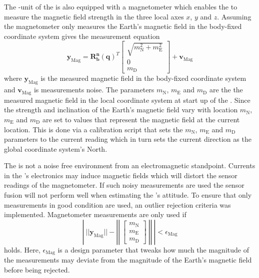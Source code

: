 The \abbrIO-unit of the \abbrROV is also equipped with a magnetometer which enables the \abbrROV to measure the magnetic field strength in the three local axes $x$, $y$ and $z$. Assuming the magnetometer only measures the Earth's magnetic field in the body-fixed coordinate system gives the measurement equation 
\begin{equation}
\boldsymbol{y}_{\text{Mag}} = 
    \boldsymbol{R^n_b}(\boldsymbol{q})^T
    \begin{bmatrix}
        \sqrt{m_\text{N}^2 +m_\text{E}^2}\\
        0\\
        m_\text{D}
    \end{bmatrix}
    + \boldsymbol{v}_{\text{Mag}}
\end{equation}
where $\boldsymbol{y}_{\text{Mag}}$ is the measured magnetic field in the body-fixed coordinate system and $\boldsymbol{v}_{\text{Mag}}$ is measurements noise. The parameters $m_\text{N}$, $m_\text{E}$ and $m_\text{D}$ are the the measured magnetic field in the local coordinate system at start up of the \abbrROV. Since the strength and inclination of the Earth's magnetic field vary with location $m_\text{N}$, $m_\text{E}$ and $m_\text{D}$ are set to values that represent the magnetic field at the current location. This is done via a calibration script that sets the $m_\text{N}$, $m_\text{E}$ and $m_\text{D}$ parameters to the current reading which in turn sets the current direction as the global coordinate system's North.

The \abbrROV is not a noise free environment from an electromagnetic standpoint. Currents in the \abbrROV's electronics may induce magnetic fields which will distort the sensor readings of the magnetometer. If such noisy measurements are used the sensor fusion will not perform well when estimating the \abbrROV's attitude. To ensure that only measurements in good condition are used, an outlier rejection criteria was implemented. Magnetometer measurements are only used if 
\begin{equation}
        \left|~||
\boldsymbol{y}_{\text{Mag}}||
    -
    \left|\left|~
    \begin{bmatrix}
        m_\text{N}\\
        m_\text{E}\\
        m_\text{D}
    \end{bmatrix}~\right|\right|
     ~\right| < \epsilon_{\text{Mag}}
\end{equation}
holds. Here, $\epsilon_{\text{Mag}}$ is a design parameter that tweaks how much the magnitude of the measurements may deviate from the magnitude of the Earth's magnetic field before being rejected.

